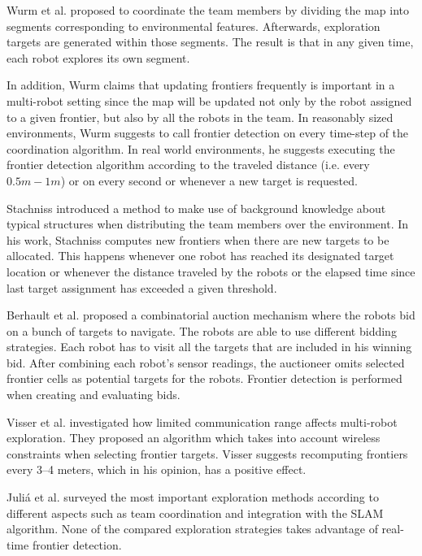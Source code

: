 Wurm et al. \cite{wurm08iros} proposed to coordinate the team members by
dividing the map into segments corresponding to environmental features.
Afterwards, exploration targets are generated within those segments. The result
is that in any given time, each robot explores its own segment. 

In addition, Wurm \cite{kai_2010_email} claims that updating frontiers
frequently is important in a multi-robot setting since the map will be updated
not only by the robot assigned to a given frontier, but also by all the robots
in the team. In reasonably sized environments, Wurm suggests to call
frontier detection on every time-step of the coordination algorithm. In
real world environments, he suggests executing the frontier detection algorithm
according to the traveled distance (i.e. every $0.5m-1m$) or on every second or
whenever a new target is requested. 


Stachniss \cite{stachniss06phd} introduced a method to make use of background
knowledge about typical structures when distributing the team members over the
environment. In his work, Stachniss computes new frontiers when there are new
targets to be allocated. This happens whenever one robot has reached its
designated target location or whenever the distance traveled by the robots or
the elapsed time since last target assignment has exceeded a given threshold.

Berhault et al. \cite{berhault_robot_2003} proposed a combinatorial
auction mechanism where the robots bid on a bunch of targets to navigate. The
robots are able to use different bidding strategies. Each robot has to visit
all the targets that are included in his winning bid. After combining each
robot's sensor readings, the auctioneer omits selected frontier cells as
potential targets for the robots. Frontier detection is performed when creating
and evaluating bids. 

Visser et al. \cite{visser2008wmcnr} investigated how limited
communication range affects multi-robot exploration. They proposed an algorithm
which takes into account wireless constraints when selecting frontier
targets. Visser \cite{visser_2010_email} suggests recomputing frontiers
every 3--4 meters, which in his opinion, has a positive effect.

Juli\'a et al. \cite{julia2012comparison} surveyed the most important
exploration methods according to different aspects such as team
coordination and integration with the SLAM algorithm. None of the
compared exploration strategies takes advantage of real-time frontier detection.

